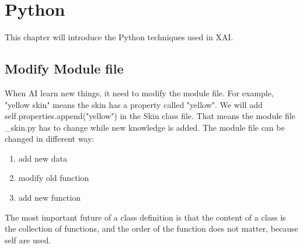 \chapter{Python}
This chapter will introduce the Python techniques used in XAI.

\section{Modify Module file} %
When AI learn new things, it need to modify the module file. For example, "yellow skin" means the skin has a property called "yellow". We will add self.properties.append("yellow")
 in the Skin class file. That means the module file \_skin.py has to change while new knowledge is added. The module file can be changed in different way:
\begin{enumerate}
	\item add new data
	\item modify old function
	\item add new function
\end{enumerate}
The most important future of a class definition is that the content of a class is the collection of functions, and the order of the function does not matter, because self are used.
